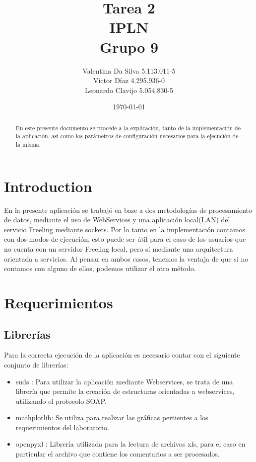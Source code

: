\documentclass[12pt]{article}
\title{Tarea 2 \\ IPLN \\ Grupo 9}
\author{
  Valentina Da Silva 5.113.011-5\\
  Victor Díaz 4.295.936-0\\
  Leonardo Clavijo 5.054.830-5
}
\date{\today}
\begin{document}
\maketitle

\begin{abstract}
En este presente documento se procede a la explicación, tanto de la implementación de la aplicación, así como los parámetros de configuración necesarios para la ejecución de la misma.
\end{abstract}

\newpage
\tableofcontents
\newpage

\section{Introduction}
En la presente aplicación se trabajó en base a dos metodologías de procesamiento de datos, mediante el uso de WebServices y una aplicación local(LAN) del servicio Freeling mediante sockets.
Por lo tanto en la implementación contamos con dos modos de ejecución, esto puede ser útil para el caso de los usuarios que no cuenta con un servidor Freeling local, pero sí mediante una arquitectura orientada a servicios.
Al pensar en ambos casos, tenemos la ventaja de que si no contamos con alguno de ellos, podemos utilizar el otro método.

\section{Requerimientos}

\subsection{Librerías}\label{lib}
Para la correcta ejecución de la aplicación es necesario contar con el siguiente conjunto de librerías:
\begin{itemize}
  \item suds :  Para utilizar la aplicación mediante Webservices, se trata de una librería que permite la creación de estructuras orientadas a webservices, utilizando el protocolo SOAP.
  \item mathplotlib: Se utiliza para realizar las gráficas pertientes a los requerimientos del laboratorio.
  \item openpyxl : Librería utilizada para la lectura de archivos xls, para el caso en particular el archivo que contiene los comentarios a ser procesados.
\end{itemize}
\end{document}
